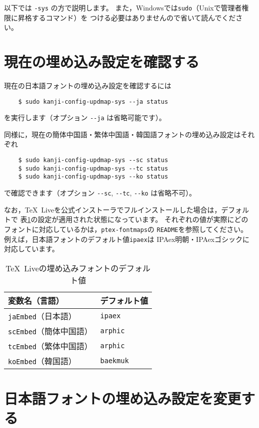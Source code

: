 \documentclass{jlreq}
\def\file#1{\texttt{#1}}
\def\command#1{\texttt{#1}}
\def\option#1{\texttt{-{}-#1}}
\def\TL{\TeX\ Live}
\begin{document}
以下では \command{-sys} の方で説明します。
また，Windowsでは\command{sudo}（Unixで管理者権限に昇格するコマンド）を
つける必要はありませんので省いて読んでください。


\section{現在の埋め込み設定を確認する}

現在の日本語フォントの埋め込み設定を確認するには
\begin{verbatim}
    $ sudo kanji-config-updmap-sys --ja status
\end{verbatim}
を実行します（オプション \option{ja} は省略可能です）。

同様に，現在の簡体中国語・繁体中国語・韓国語フォントの埋め込み設定はそれぞれ
\begin{verbatim}
    $ sudo kanji-config-updmap-sys --sc status
    $ sudo kanji-config-updmap-sys --tc status
    $ sudo kanji-config-updmap-sys --ko status
\end{verbatim}
で確認できます（オプション \option{sc}, \option{tc}, \option{ko} は省略不可）。

なお，\TL を公式インストーラでフルインストールした場合は，デフォルトで
表\ref{tldefault}の設定が適用された状態になっています。
それぞれの値が実際にどのフォントに対応しているかは，\file{ptex-fontmaps}の
\file{README}を参照してください。
例えば，日本語フォントのデフォルト値\command{ipaex}は
IPAex明朝・IPAexゴシックに対応しています。
\begin{table}[h]
  \centering
  \caption{\TL の埋め込みフォントのデフォルト値}\label{tldefault}
  \begin{tabular}{m{}m{}}
  \hline
  変数名（言語）                  & デフォルト値      \\ \hline
  \command{jaEmbed}（日本語）     & \command{ipaex}   \\
  \command{scEmbed}（簡体中国語） & \command{arphic}  \\
  \command{tcEmbed}（繁体中国語） & \command{arphic}  \\
  \command{koEmbed}（韓国語）     & \command{baekmuk} \\ \hline
\end{tabular}
\end{table}


\section{日本語フォントの埋め込み設定を変更する}
\end{document}

